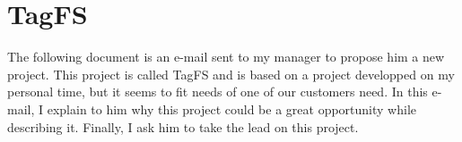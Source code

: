 \chapter{TagFS}


The following document is an e-mail sent to my manager to propose him a new project. This project is called TagFS and is based on a project developped on my personal time, but it seems to fit needs of one of our customers need. In this e-mail, I explain to him why this project could be a great opportunity while describing it. Finally, I ask him to take the lead on this project.

\clearpage

